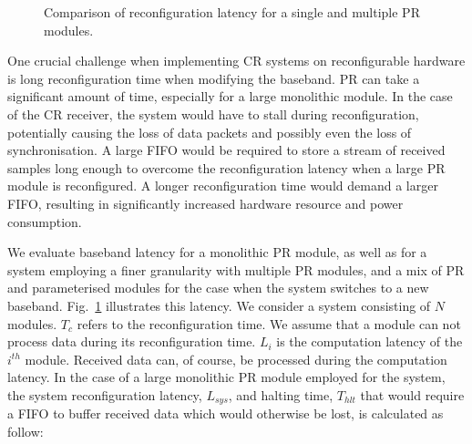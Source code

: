 \begin{figure}
\caption{Comparison of reconfiguration latency for a single and multiple PR modules.}
\label{fig:timing}
\end{figure}

One crucial challenge when implementing CR systems on reconfigurable hardware is long reconfiguration time when modifying the baseband.
PR can take a significant amount of time, especially for a large monolithic module.
In the case of the CR receiver, the system would have to stall during reconfiguration, potentially causing the loss of data packets and possibly even the loss of synchronisation.
A large FIFO would be required to store a stream of received samples long enough to overcome the reconfiguration latency when a large PR module is reconfigured.
A longer reconfiguration time would demand a larger FIFO, resulting in significantly increased hardware resource and power consumption.

We evaluate baseband latency for a monolithic PR module, as well as for a system employing a finer granularity with multiple PR modules, and a mix of PR and parameterised modules for the case when the system switches to a new baseband.
Fig.~\ref{fig:timing} illustrates this latency. We consider a system consisting of $N$ modules. $T_{c}$ refers to the reconfiguration time.
We assume that a module can not process data during its reconfiguration time.
$L_{i}$ is the computation latency of the $i^{th}$ module. Received data can, of course, be processed during the computation latency. In the case of a large monolithic PR module employed for the system, the system reconfiguration latency, $L_{sys}$, and halting time, $T_{hlt}$ that would require a FIFO to buffer received data which would otherwise be lost, is calculated as follow:

